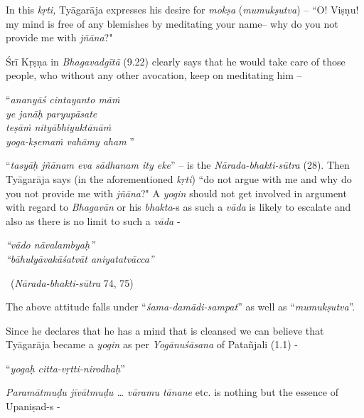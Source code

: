 In this \textit{kṛti,} Tyāgarāja expresses his desire for \textit{mokṣa} (\textit{mumukṣutva}) – ``O! Viṣṇu! my mind is free of any blemishes by meditating your name– why do you not provide me with \textit{jñāna}?"

Śrī Kṛṣṇa in \textit{Bhagavadgītā} (9.22) clearly says that he would take care of those people, who without any other avocation, keep on meditating him –

\begin{centerquote}
“\textit{ananyāś cintayanto māṁ}\\ \textit{ye janāḥ paryupāsate }\\ \textit{teṣāṁ nityābhiyuktānāṁ}\\ \textit{yoga-kṣemaṁ vahāmy aham} ”
\end{centerquote}

“\textit{tasyāḥ jñānam eva sādhanam ity eke}” – is the \textit{Nārada-bhakti-sūtra} (28). Then Tyāgarāja says (in the aforementioned \textit{kṛti}) ``do not argue with me and why do you not provide me with \textit{jñāna}?" A \textit{yogin} should not get involved in argument with regard to \textit{Bhagavān} or his \textit{bhakta}-s as such a \textit{vāda} is likely to escalate and also as there is no limit to such a \textit{vāda} -

\begin{centerquote}
\textit{“vādo nāvalambyaḥ”}\\ \textit{“bāhulyāvakāśatvāt aniyatatvācca”} 

~\hfill (\textit{Nārada-bhakti-sūtra} 74, 75)
\end{centerquote}

The above attitude falls under “\textit{śama-damādi-sampat}” as well as “\textit{mumukṣutva}”.

Since he declares that he has a mind that is cleansed we can believe that Tyāgarāja became a \textit{yogin} as per \textit{Yogānuśāsana} of Patañjali (1.1) -

\begin{centerquote}
“\textit{yogaḥ citta-vṛtti-nirodhaḥ}”
\end{centerquote}

\textit{Paramātmuḍu jīvātmuḍu … vāramu tānane} etc. is nothing but the essence of Upaniṣad-s -

